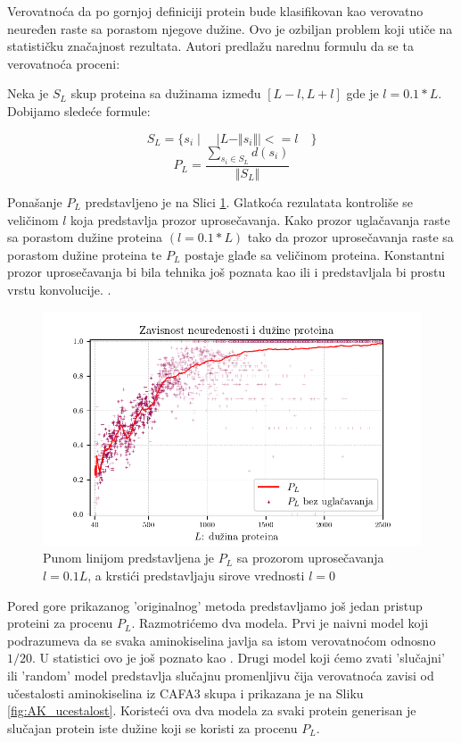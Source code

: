 Verovatnoća da po gornjoj definiciji protein bude klasifikovan kao verovatno
neuređen raste sa porastom njegove dužine. Ovo je ozbiljan problem koji utiče
na statističku značajnost rezultata. Autori \parencite{Xie2007} 
predlažu narednu formulu da se ta verovatnoća proceni:

Neka je $S_L$ skup proteina sa dužinama između $[L-l, L+l]$ gde je $l
= 0.1*L$. Dobijamo sledeće formule:

$$ S_L = \{s_i \mid \quad | L -  \Vert s_i \Vert | <= l \quad   \}$$
$$ P_L = \dfrac{ \sum_{s_i \in S_L} d(s_i)} {\Vert S_L \Vert}$$

Ponašanje $P_L$ predstavljeno je na Slici \ref{fig:PL1}. Glatkoća rezulatata
kontroliše se veličinom $l$ koja predstavlja prozor uprosečavanja. Kako prozor
uglačavanja raste sa porastom dužine proteina $(l = 0.1*L)$
tako da prozor uprosečavanja raste sa porastom dužine proteina te $P_L$
postaje glađe sa veličinom proteina. Konstantni prozor uprosečavanja bi bila
tehnika još poznata kao  ili  i
predstavljala bi prostu vrstu konvolucije. .


\begin{figure}[th]
\centering
\includegraphics[]{plots/PL_F}
\decoRule
\caption {
 Punom linijom predstavljena je $P_L$ sa prozorom uprosečavanja $l = 0.1L$,
 a krstići predstavljaju sirove vrednosti $l = 0$ 
}
\label{fig:PL1}
\end{figure}


Pored gore prikazanog 'originalnog' metoda predstavljamo još jedan pristup
  proteini za procenu $P_L$.
Razmotrićemo dva modela. Prvi je naivni model 
koji podrazumeva da se svaka aminokiselina javlja sa istom verovatnoćom odnosno
$1/20$. U statistici ovo je još poznato kao .  Drugi
model koji ćemo zvati 'slučajni' ili 'random' model predstavlja slučajnu
promenljivu čija verovatnoća zavisi od učestalosti aminokiselina iz CAFA3 skupa
i prikazana je na Sliku \ref{fig:AK_ucestalost}.  Koristeći ova dva modela za
svaki protein generisan je slučajan protein iste dužine koji se koristi za
procenu $P_L$.


